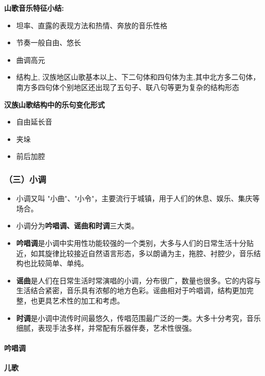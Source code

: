\documentclass[
]{article}
\providecommand{\tightlist}{%
  \setlength{\itemsep}{0pt}\setlength{\parskip}{0pt}}
\begin{document}
\textbf{山歌音乐特征小结:}

\begin{itemize}
\tightlist
\item
  坦率、直露的表现方法和热情、奔放的音乐性格
\item
  节奏一般自由、悠长
\item
  曲调高元
\item
  结构上,
  汉族地区山歌基本以上、下二句体和四句体为主,其中北方多二句体，南方多四句体个别地区还出现了五句子、联八句等更为复杂的结构形态
\end{itemize}

\textbf{汉族山歌结构中的乐句变化形式}

\begin{itemize}
\tightlist
\item
  自由延长音
\item
  夹垛
\item
  前后加腔
\end{itemize}

\subsubsection{（三）小调}\label{ux4e09ux5c0fux8c03}

\begin{itemize}
\tightlist
\item
  小调又叫
  "小曲"、"小令"，主要流行于城镇，用于人们的休息、娱乐、集庆等场合。
\item
  小调分为\textbf{吟唱调、谣曲和时调}三大类。
\item
  \textbf{吟唱调}是小调中实用性功能较强的一个类别，大多与人们的日常生活十分贴近，如其旋律比较接近自然语言形态，多以朗诵为主，拖腔、衬腔少，音乐结构也比较简单、单纯。
\item
  \textbf{谣曲}是人们在日常生活时常演唱的小调，分布很广，数量也很多。它的内容与生活结合紧密，音乐具有浓郁的地方色彩。谣曲相对于吟唱调，结构更加完整，也更具艺术性的加工和考虑。
\item
  \textbf{时调}是小调中流传时间最悠久，传唱范围最广泛的一类。大多十分考究，音乐细腻，表现手法多样，并常配有乐器伴奏，艺术性很强。
\end{itemize}

\paragraph{吟唱调}\label{ux541fux5531ux8c03}

\textbf{儿歌}
\end{document}

